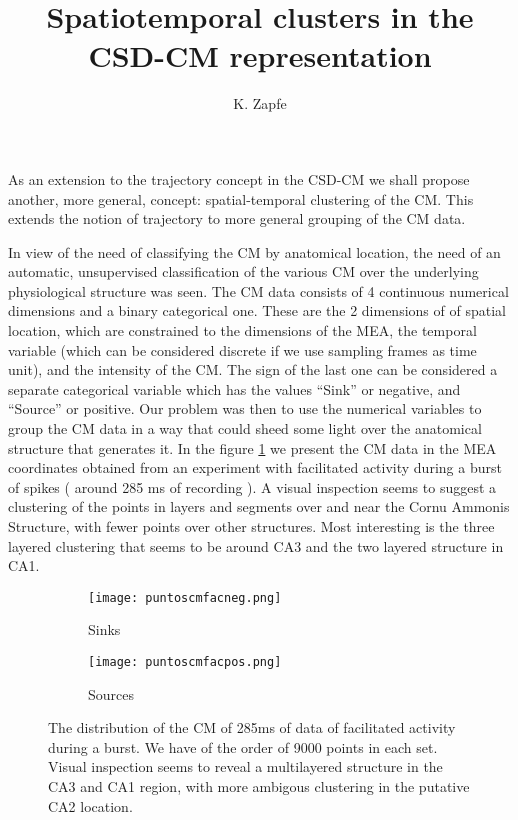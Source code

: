 \documentclass{article}
\author{K. Zapfe}
\title{Spatiotemporal clusters in the CSD-CM representation}
\begin{document}
\maketitle


As an extension to the trajectory concept in the CSD-CM we
shall propose another,  more general, concept: spatial-temporal
clustering of the CM.
This extends the notion of trajectory to more general grouping of the
CM data.

In view of the need of classifying the CM by anatomical location,
the need of an automatic, unsupervised classification of the various CM
over the underlying physiological structure was seen.  The CM data
consists of 4 continuous numerical dimensions and a binary categorical
one. These are the 2 dimensions of of spatial location, which are constrained
to the dimensions of the MEA, the temporal variable (which can be
considered discrete if we use sampling frames as time unit), and the intensity of the CM.
The sign of the last one can be considered a separate categorical variable which
has the values ``Sink'' or negative, and ``Source'' or positive. 
Our problem was then to use the numerical variables to group the CM data in
a way that could sheed some light over the anatomical structure that
generates it. In the figure \ref{puntostodos} we present the CM data
in the MEA coordinates obtained from an experiment with facilitated activity
during a burst of spikes ( around 285 ms of recording ). A visual inspection
seems to suggest a clustering of the points in layers and segments over and near the
Cornu Ammonis Structure, with fewer points over other structures. Most interesting
is the three layered clustering that seems to be around CA3 and the two layered
structure in CA1. 

\begin{figure}
\centering
\begin{subfigure}{0.40\textwidth}
\texttt{[image: puntoscmfacneg.png]}
\caption{Sinks}
\end{subfigure}
\begin{subfigure}{0.40\textwidth}
\texttt{[image: puntoscmfacpos.png]}
\caption{Sources}
\end{subfigure}

\caption{The distribution of the CM of 285ms of data of facilitated activity
during a burst. We have of the order of 9000 points in each
set. Visual inspection seems to reveal a multilayered structure in the
CA3 and CA1 region, with more ambigous clustering in the putative
CA2 location.}\label{puntostodos}

\end{figure}
\end{document}
